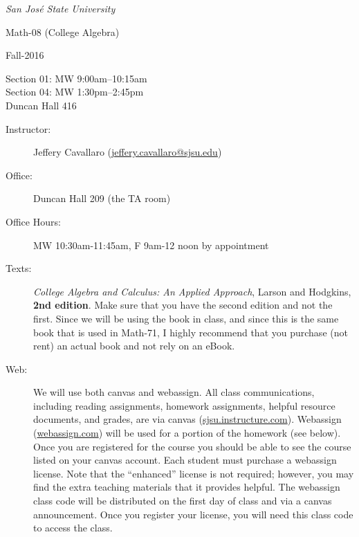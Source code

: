 \documentclass[letterpaper,12pt,fleqn]{article}
\begin{document}
\begin{center}
\emph{San Jos\'{e} State University}

\Large{Math-08 (College Algebra)}\normalsize

\large{Fall-2016}\normalsize

Section 01: MW 9:00am--10:15am \\
Section 04: MW 1:30pm--2:45pm \\

Duncan Hall 416
\end{center}

\vspace{0.5in}

\begin{description}

\item[Instructor:] Jeffery Cavallaro (\url{jeffery.cavallaro@sjsu.edu})

\item[Office:] Duncan Hall 209 (the TA room)

\item[Office Hours:] MW 10:30am-11:45am, F 9am-12 noon by appointment

\item[Texts:] \emph{College Algebra and Calculus: An Applied Approach},
  Larson and Hodgkins, \textbf{2nd edition}.  Make sure that you have the
  second edition and not the first. Since we will be using the book in class,
  and since this is the same book that is used in Math-71, I highly recommend
  that you purchase (not rent) an actual book and not rely on an eBook.

\item[Web:] We will use both canvas and webassign. All class communications,
  including reading assignments, homework assignments, helpful resource
  documents, and grades, are via canvas (\url{sjsu.instructure.com}). Webassign
  (\url{webassign.com}) will be used for a portion of the homework (see below).
  Once you are registered for the course you should be able to see the course
  listed on your canvas account. Each student must purchase a webassign
  license. Note that the ``enhanced'' license is not required; however, you
  may find the extra teaching materials that it provides helpful. The
  webassign class code will be distributed on the first day of class and via
  a canvas announcement. Once you register your license, you will need this
  class code to access the class.


\end{description}
\end{document}
